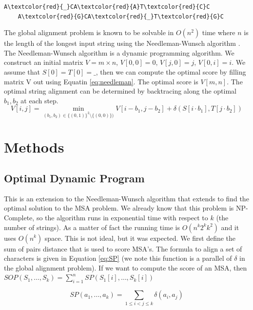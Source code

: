 \documentclass[11pt]{article}
\begin{document}
\begin{Verbatim}[commandchars=\\\{\}]
    A\textcolor{red}{_}CA\textcolor{red}{A}T\textcolor{red}{C}C
    A\textcolor{red}{G}CA\textcolor{red}{_}T\textcolor{red}{G}C
\end{Verbatim}

The global alignment problem is known to be solvable in $O(n^2)$ time where $n$ is the length of the longest input string
using the Needleman-Wunsch algorithm \cite{needleman1970general}.
The Needleman-Wunsch algorithm is a dynamic programming algorithm.
We construct an initial matrix $V = m \times n$, $V[0,0] = 0$, $V[j, 0] = j$, $V[0, i] = i$.
We assume that $S[0] = T[0] = \_$, then we can compute the optimal score by filling matrix V out using Equatin \ref{eq:needleman}.
The optimal score is $V[m, n]$. 
The optimal string alignment can be determined by backtracing along the optimal $b_1, b_2$ at each step.
\begin{equation}
    V[i,j] = \min_{(b_1, b_2) \in \{ (0, 1)\}^ 2 \setminus \{ (0,0)\})} 
    V[i-b_1, j-b_2] + \delta(S[i \cdot b_1], T[j \cdot b_2])
    \label{eq:needleman}
\end{equation}

\section{Methods}

\subsection{Optimal Dynamic Program}

This is an extension to the Needleman-Wunsch algorithm that extends to find the optimal solution to the MSA problem.
We already know that this problem is NP-Complete, so the algorithm runs in exponential time with respect to $k$ (the number of strings).
As a matter of fact the running time is $O(n^k 2^k k^2)$ and it uses $O(n^k)$ space.
This is not ideal, but it was expected. 
We first define the sum of pairs distance that is used to score MSA's. 
The formula to align a set of characters is given in Equation \ref{eq:SP}
 (we note this function is a parallel of $\delta$ in the global alignment problem).
If we want to compute the score of an MSA, then $SOP(S_1, \dots, S_k) = \sum_{i = 1} ^n SP(S_1[i], \dots , S_k[i])$

\begin{equation}
    SP(a_1, \dots, a_k) = \sum_{1 \leq i < j \leq k} \delta(a_i, a_j)
    \label{eq:SP}
\end{equation}
\end{document}
